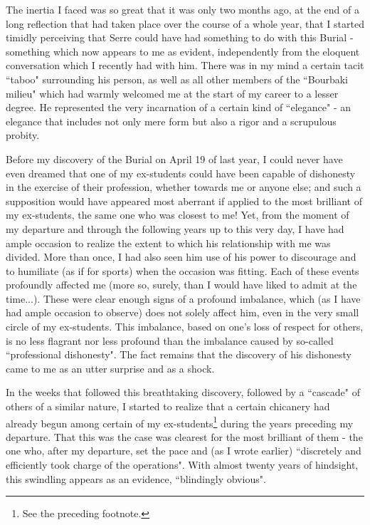 The inertia I faced was so great that it was only two months ago, at the end of a long reflection that had taken place over the course of a whole year, that I started timidly perceiving that Serre could have had something to do with this Burial - something which now appears to me as evident, independently from the eloquent conversation which I recently had with him. There was in my mind a certain tacit ``taboo" surrounding his person, as well as all other members of the ``Bourbaki milieu" which had warmly welcomed me at the start of my career to a lesser degree. He represented the very incarnation of a certain kind of ``elegance" - an elegance that includes not only mere form but also a rigor and a scrupulous probity. 

Before my discovery of the Burial on April 19 of last year, I could never have even dreamed that one of my ex-students could have been capable of dishonesty in the exercise of their profession, whether towards me or anyone else; and such a supposition would have appeared most aberrant if applied to the most brilliant of my ex-students, the same one who was closest to me! Yet, from the moment of my departure and through the following years up to this very day, I have had ample occasion to realize the extent to which his relationship with me was divided. More than once, I had also seen him use of his power to discourage and to humiliate (as if for sports) when the occasion was fitting. Each of these events profoundly affected me (more so, surely, than I would have liked to admit at the time...). These were clear enough signs of a profound imbalance, which (as I have had ample occasion to observe) does not solely affect him, even in the very small circle of my ex-students. This imbalance, based on one's loss of respect for others, is no less flagrant nor less profound than the imbalance caused by so-called ``professional dishonesty". The fact remains that the discovery of his dishonesty came to me as an utter surprise and as a shock. 

In the weeks that followed this breathtaking discovery, followed by a ``cascade" of others of a similar nature, I started to realize that a certain chicanery had already begun among certain of my ex-students\footnote{See the preceding footnote.} during the years preceding my departure. That this was the case was clearest for the most brilliant of them - the one who, after my departure, set the pace and (as I wrote earlier) ``discretely and efficiently took charge of the operations". With almost twenty years of hindsight, this swindling appears as an evidence, ``blindingly obvious". 


